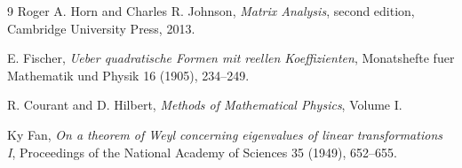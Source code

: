 \begin{thebibliography}{9}
Roger A. Horn and Charles R. Johnson,
\emph{Matrix Analysis}, second edition,
Cambridge University Press, 2013.

E. Fischer,
\emph{Ueber quadratische Formen mit reellen Koeffizienten},
Monatshefte fuer Mathematik und Physik 16 (1905), 234--249.

R. Courant and D. Hilbert,
\emph{Methods of Mathematical Physics}, Volume I.

Ky Fan,
\emph{On a theorem of Weyl concerning eigenvalues of linear transformations I},
Proceedings of the National Academy of Sciences 35 (1949), 652--655.
\end{thebibliography}



